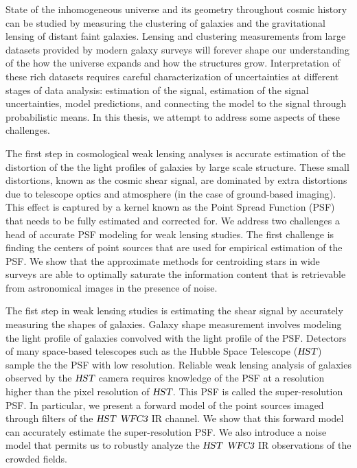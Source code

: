 State of the inhomogeneous universe and its geometry throughout cosmic history can be studied by measuring the clustering of galaxies and the gravitational lensing of distant faint galaxies. Lensing and clustering measurements from large datasets provided by modern galaxy surveys will forever shape our understanding of the how the universe expands and how the structures grow. Interpretation of these rich datasets requires careful characterization of uncertainties at different stages of data analysis: estimation of the signal, estimation of the signal uncertainties, model predictions, and connecting the model to the signal through probabilistic means. In this thesis, we attempt to address some aspects of these challenges.  

The first step in cosmological weak lensing analyses is accurate estimation of the distortion of the the light profiles of galaxies by large scale structure. These small distortions, known as the cosmic shear signal, are dominated by extra distortions due to telescope optics and atmosphere (in the case of ground-based imaging). This effect is captured by a kernel known as the Point Spread Function (PSF) that needs to be fully estimated and corrected for. We address two challenges a head of accurate PSF modeling for weak lensing studies. The first challenge is finding the centers of point sources that are used for empirical estimation of the PSF. We show that the approximate methods for centroiding stars in wide surveys are able to optimally saturate the information content that is retrievable from astronomical images in the presence of noise. 

The fist step in weak lensing studies is estimating the shear signal by accurately measuring the shapes of galaxies. Galaxy shape measurement involves modeling the light profile of galaxies convolved with the light profile of the PSF. Detectors of many space-based telescopes such as the Hubble Space Telescope ($\textsl{HST}$) sample the the PSF with low resolution. Reliable weak lensing analysis of galaxies observed by the $\textsl{HST}$ camera requires knowledge of the PSF at a resolution higher than the pixel resolution of $\textsl{HST}$. This PSF is called the super-resolution PSF. In particular, we present a forward model of the point sources imaged through filters of the $\textsl{HST}$ $\textsl{WFC3}$ IR channel. We show that this forward model can accurately estimate the super-resolution PSF. We also introduce a noise model that permits us to robustly analyze the $\textsl{HST}$ $\textsl{WFC3}$ IR observations of the crowded fields.    

